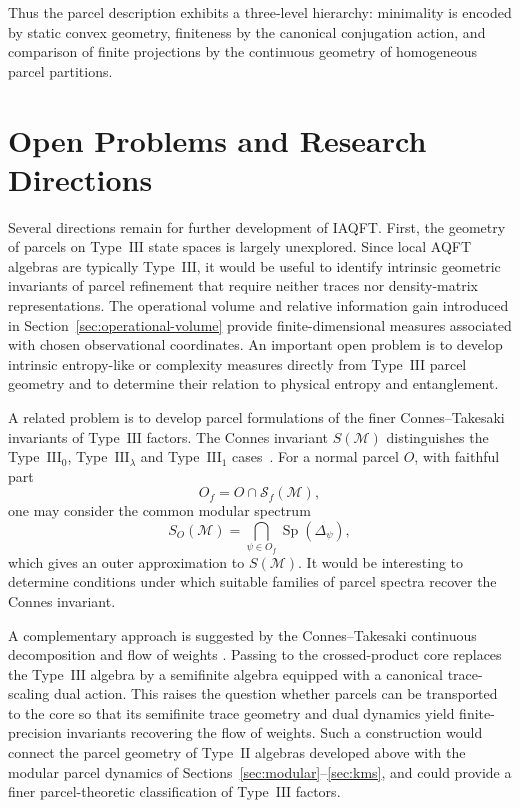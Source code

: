 \documentclass[11pt]{article}
\begin{document}
Thus the parcel description exhibits a three-level hierarchy:
minimality is encoded by static convex geometry, finiteness by the
canonical conjugation action, and comparison of finite projections by
the continuous geometry of homogeneous parcel partitions.


\section{Open Problems and Research Directions}
\label{sec:open}

Several directions remain for further development of IAQFT. First, the
geometry of parcels on Type~$\mathrm{III}$ state spaces is largely
unexplored. Since local AQFT algebras are typically Type~$\mathrm{III}$,
it would be useful to identify intrinsic geometric invariants of parcel
refinement that require neither traces nor density-matrix
representations. The operational volume and relative information gain
introduced in Section~\ref{sec:operational-volume} provide
finite-dimensional measures associated with chosen observational
coordinates. An important open problem is to develop intrinsic
entropy-like or complexity measures directly from Type~$\mathrm{III}$
parcel geometry and to determine their relation to physical entropy and
entanglement.

A related problem is to develop parcel formulations of the finer
Connes--Takesaki invariants of Type~$\mathrm{III}$ factors. The Connes
invariant $S(\mathcal M)$ distinguishes the
Type~$\mathrm{III}_0$, Type~$\mathrm{III}_\lambda$ and
Type~$\mathrm{III}_1$ cases~\cite{Connes1973}. For a normal parcel $O$,
with faithful part
\[
O_f=O\cap\mathcal S_f(\mathcal M),
\]
one may consider the common modular spectrum
\[
S_O(\mathcal M)
=
\bigcap_{\psi\in O_f}\operatorname{Sp}(\Delta_\psi),
\]
which gives an outer approximation to $S(\mathcal M)$. It would be
interesting to determine conditions under which suitable families of
parcel spectra recover the Connes invariant.

A complementary approach is suggested by the Connes--Takesaki
continuous decomposition and flow of weights
\cite{ConnesTakesaki1977}. Passing to the crossed-product core replaces
the Type~$\mathrm{III}$ algebra by a semifinite algebra equipped with a
canonical trace-scaling dual action. This raises the question whether
parcels can be transported to the core so that its semifinite trace
geometry and dual dynamics yield finite-precision invariants recovering
the flow of weights. Such a construction would connect the parcel
geometry of Type~$\mathrm{II}$ algebras developed above with the modular
parcel dynamics of Sections~\ref{sec:modular}--\ref{sec:kms}, and could
provide a finer parcel-theoretic classification of Type~$\mathrm{III}$
factors.
\end{document}
